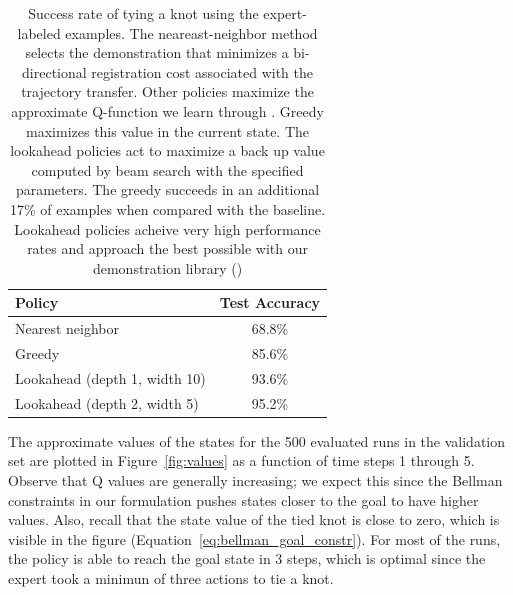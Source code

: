 \begin{table}
  \centering
  \begin{tabular}{lc}
    \toprule
      Policy & Test Accuracy\\
    \midrule
      Nearest neighbor \cite{Schulmanetal_ISRR2013} & 68.8\% \\
    \midrule
      Greedy & 85.6\% \\
      Lookahead (depth 1, width 10) & 93.6\% \\
      Lookahead (depth 2, width 5) & 95.2\% \\
    \bottomrule
  \end{tabular}
  \caption{Success rate of tying a knot using the expert-labeled examples. The neareast-neighbor method selects
           the demonstration that minimizes a bi-directional registration cost associated with the trajectory transfer.
           Other policies maximize the approximate Q-function we learn through \mmql{}. Greedy maximizes this value in the current
           state. The lookahead policies act to maximize a back up value computed by beam search with the specified parameters. The greedy
           succeeds in an additional 17\% of examples when compared with the baseline. Lookahead policies acheive very high performance rates
           and approach the best possible with our demonstration library ()}
  \label{table:performance}
\end{table}

The approximate values of the states for the 500 evaluated runs in the validation set are plotted in Figure~\ref{fig:values} as a function of time steps 1 through 5.
Observe that Q values are generally increasing; we expect this since the Bellman constraints in our formulation pushes states closer to the goal to have higher values.
Also, recall that the state value of the tied knot is close to zero, which is visible in the figure (Equation~\ref{eq:bellman_goal_constr}).
For most of the runs, the policy is able to reach the goal state in 3 steps, which is optimal since the expert took a minimun of three actions to tie a knot.

